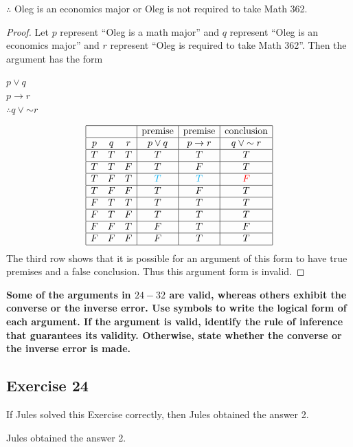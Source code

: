 \documentclass[14pt]{extarticle}
\begin{document}
$\therefore$ Oleg is an economics major or Oleg is not required to take Math
362.

\begin{proof} Let $p$ represent “Oleg is a math major” and $q$ represent “Oleg
is an economics major” and $r$ represent ``Oleg is required to take Math 362''.
Then the argument has the form

\begin{center} $p \vee q$ \\ $p \to r$ \\ $\therefore q \vee {\sim r}$ \\
\end{center}

$$ \begin{array}{|ccc|c|c|c|} \hline &&& \text{premise} & \text{premise} &
\text{conclusion} \\ \hline p & q & r & p \vee q & p \to r & q \vee {\sim r} \\
\hline T & T & T & T & T & T \\ \hline T & T & F & T & F & T \\ \hline T & F & T
& \color{cyan}T & \color{cyan}T & \color{red}F \\ \hline T & F & F & T & F & T
\\ \hline F & T & T & T & T & T \\ \hline F & T & F & T & T & T \\ \hline F & F
& T & F & T & F \\ \hline F & F & F & F & T & T \\ \hline \end{array} $$ The
third row shows that it is possible for an argument of this form to have true
premises and a false conclusion. Thus this argument form is invalid. \end{proof}

{\bf \color{cyan} Some of the arguments in $24-32$ are valid, whereas others
exhibit the converse or the inverse error. Use symbols to write the logical form
of each argument. If the argument is valid, identify the rule of inference that
guarantees its validity. Otherwise, state whether the converse or the inverse
error is made.}

\subsection{Exercise 24} If Jules solved this Exercise correctly, then Jules
obtained the answer 2.

Jules obtained the answer 2.
\end{document}

